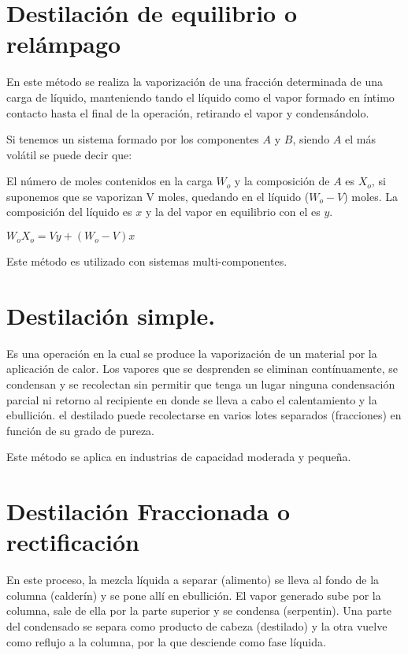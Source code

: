 \documentclass[11pt,openany]{book}
\begin{document}

\section {Destilación de equilibrio o relámpago}

En este método se realiza la vaporización de una fracción determinada de una carga de líquido,
manteniendo tando el líquido como el vapor formado en íntimo contacto hasta el final de la 
operación, retirando el vapor y condensándolo.

Si tenemos un sistema formado por los componentes $A$ y $B$, siendo $A$ el más volátil se puede decir que:

El número de moles contenidos en la carga $W_o$ y la composición de $A$ es $X_o$, si suponemos que se 
vaporizan V moles, quedando en el líquido ($W_o - V$) moles. La composición del líquido es $x$ y la del 
vapor en equilibrio con el es $y$.

$W_o X_o = V y +(W_o -V) x$


Este método es utilizado con sistemas multi-componentes.

\section {Destilación simple.}

Es una operación en la cual se produce la vaporización de un material por la aplicación de calor. Los 
vapores que se desprenden se eliminan contínuamente, se condensan y se recolectan sin permitir 
que tenga un lugar ninguna condensación parcial ni retorno al recipiente en donde se lleva a cabo 
el calentamiento y la ebullición. el destilado puede recolectarse en varios lotes separados
 (fracciones) en función de su grado de pureza.

 Este método se aplica en industrias de capacidad moderada y pequeña.

 \section{Destilación Fraccionada o rectificación}

En este proceso, la mezcla líquida a separar (alimento) se lleva al fondo de la columna (calderín) y 
se pone allí en ebullición. El vapor generado sube por la columna, sale de ella por la parte superior y 
se condensa (serpentin). Una parte del condensado se separa como producto de cabeza (destilado) y la otra 
vuelve como reflujo a la columna, por la que desciende como fase líquida.
\end{document}
